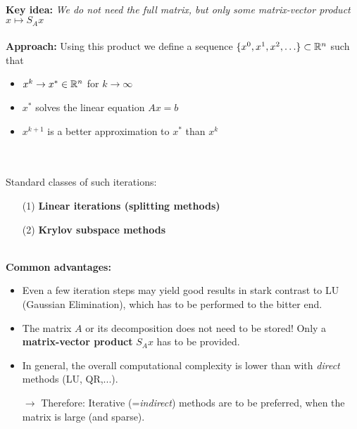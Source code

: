 \begin{frame}
~\\
\textbf{Key idea:} \textit{We do not need the full matrix, but only some matrix-vector product $x \mapsto S_Ax$}\\
~\\
 {\bf Approach:} Using this product we define a sequence $\{x^0,x^1,x^2,\ldots\}\subset{\mathbb{R}}^n$ such that
 \begin{itemize}
 	\item $x^k\to x^*\in{\mathbb{R}}^n$ for $k\to\infty$
 	\item $x^*$ solves the linear equation $Ax=b$
 	\item $x^{k+1}$ is a better approximation to $x^*$ than $x^k$
 \end{itemize} 
 ~\\~\\
 Standard classes of such iterations:\\
 \begin{itemize}
 \item[(1)] \textbf{Linear iterations (splitting methods)}  
 \item[(2)]  \textbf{Krylov subspace methods} 
\end{itemize}
 ~\\
\textbf{ Common advantages: }
 \begin{itemize}
 \item Even a few iteration steps may yield good results in stark contrast to LU (Gaussian Elimination), which has to be performed to the bitter end.~\\\vspace{0.2cm}
 \item The matrix $A$ or its decomposition does not need to be stored! Only a \textbf{matrix-vector product} $S_Ax$ has to be provided.~\\\vspace{0.2cm}
 \item In general, the overall computational complexity is lower than with \textit{direct} methods (LU, QR,...).~\\\vspace{0.2cm}
 \item[$\rightarrow$] Therefore: Iterative (=\textit{indirect}) methods are to be preferred, when the matrix is large (and sparse).
\end{itemize}
\end{frame}
 
